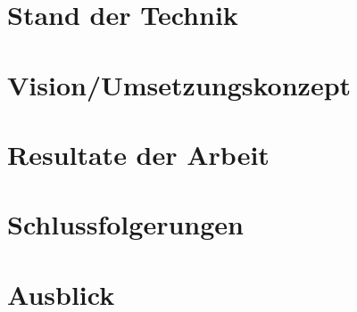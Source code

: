 \section{Stand der Technik}

\section{Vision/Umsetzungskonzept}

\section{Resultate der Arbeit}

\section{Schlussfolgerungen}

\section{Ausblick}